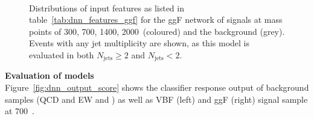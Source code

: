 \begin{figure}[htbp]
        \\

        \caption{Distributions of input features as listed in table~\ref{tab:dnn_features_ggf} for the ggF network of signals at mass points of 300, 700, 1400, 2000~\gev (coloured) and the background (grey). Events with any jet multiplicity are shown, as this model is evaluated in both $N_\mathrm{jets}\geq2$ and $N_\mathrm{jets}<2$.}
        \label{fig:dnn_ggf_distribution}
\end{figure}

\textbf{Evaluation of models} \\
Figure~\ref{fig:dnn_output_score} shows the classifier response output of background samples (QCD and EW \qqZZ and \ggZZ) as well as VBF (left) and ggF (right) signal sample at 700~\gev.

